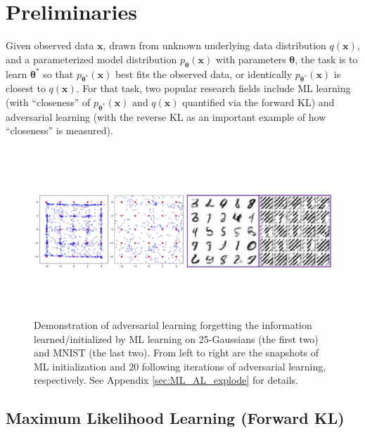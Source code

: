 \documentclass[letterpaper]{article} %
\newcommand{\xv}[0]{\ensuremath{\boldsymbol{x}} }
\newcommand{\thetav}[0]{\ensuremath{\boldsymbol{\theta}} }
\begin{document}
\section{Preliminaries}
\label{sec:Preliminary}




Given observed data $\xv$, drawn from unknown underlying data distribution $q(\xv)$, and a parameterized model distribution $p_{\thetav}(\xv)$ with parameters $\thetav$, the task is to learn $\thetav^{*}$ so that $p_{\thetav^{*}}(\xv)$ best fits the observed data, or identically $p_{\thetav^{*}}(\xv)$ is closest to $q(\xv)$.
For that task, two popular research fields include ML learning (with ``closeness'' of $p_{\thetav^{*}}(\xv)$ and $q(\xv)$ quantified via the forward KL) and adversarial learning (with the reverse KL as an important example of how ``closeness'' is measured).



\begin{figure}[tb]
	\centering
		\includegraphics[height=0.23 \columnwidth]{Figures/25GS_MNIST_SN_Forgetting.pdf}
		\caption{
			Demonstration of adversarial learning forgetting the information learned/initialized by ML learning on 25-Gaussians (the first two) and MNIST (the last two). From left to right are the snapshots of ML initialization and $20$ following iterations of adversarial learning, respectively. See 
			Appendix \ref{sec:ML_AL_explode} 
			for details.
		}
		\label{fig:explodes}
\end{figure}


\subsection{Maximum Likelihood Learning (Forward KL)}
\end{document}
